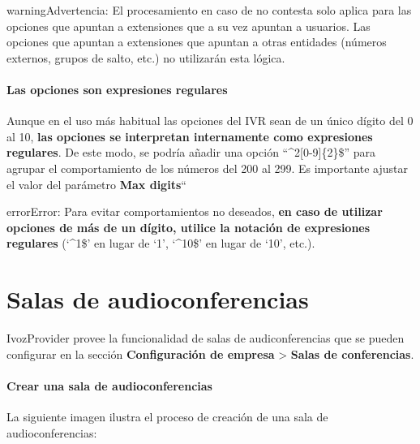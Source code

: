 \documentclass[letterpaper,10pt,spanish]{sphinxmanual}
\begin{document}
\begin{notice}{warning}{Advertencia:}
El procesamiento en caso de no contesta solo aplica para las opciones que apuntan a extensiones que a su vez apuntan a usuarios. Las opciones que apuntan a extensiones que apuntan a otras entidades (números externos, grupos de salto, etc.) no utilizarán esta lógica.
\end{notice}
\paragraph{Las opciones son expresiones regulares}

Aunque en el uso más habitual las opciones del IVR sean de un único dígito del 0 al 10, \textbf{las opciones se interpretan internamente como expresiones regulares}. De este modo, se podría añadir una opción ``\textasciicircum{}2{[}0-9{]}\{2\}\$'' para agrupar el comportamiento de los números del 200 al 299. Es importante ajustar el valor del parámetro \textbf{Max digits}``

\begin{notice}{error}{Error:}
Para evitar comportamientos no deseados, \textbf{en caso de utilizar opciones de más de un dígito, utilice la notación de expresiones regulares} (`\textasciicircum{}1\$' en lugar de `1', `\textasciicircum{}10\$' en lugar de `10', etc.).
\end{notice}


\section{Salas de audioconferencias}
\label{pbx_features/conference_rooms::doc}\label{pbx_features/conference_rooms:conference-rooms}\label{pbx_features/conference_rooms:id1}
IvozProvider provee la funcionalidad de salas de audiconferencias que se pueden configurar en la sección \textbf{Configuración de empresa} \textgreater{} \textbf{Salas de conferencias}.
\paragraph{Crear una sala de audioconferencias}

La siguiente imagen ilustra el proceso de creación de una sala de audioconferencias:
\end{document}
